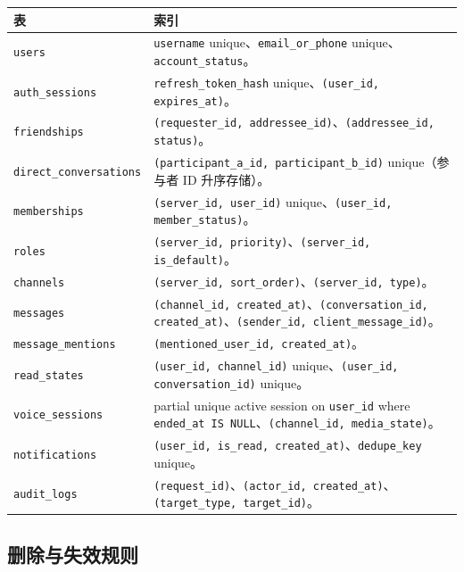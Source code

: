 \noindent\begin{tabularx}{\textwidth}{L{3.4cm}Y}
  \toprule
  表 & 索引 \\
  \midrule
  \texttt{users} & \texttt{username} unique、\texttt{email\_or\_phone} unique、\texttt{account\_status}。 \\
  \texttt{auth\_sessions} & \texttt{refresh\_token\_hash} unique、\texttt{(user\_id, expires\_at)}。 \\
  \texttt{friendships} & \texttt{(requester\_id, addressee\_id)}、\texttt{(addressee\_id, status)}。 \\
  \texttt{direct\_conversations} & \texttt{(participant\_a\_id, participant\_b\_id)} unique（参与者 ID 升序存储）。 \\
  \texttt{memberships} & \texttt{(server\_id, user\_id)} unique、\texttt{(user\_id, member\_status)}。 \\
  \texttt{roles} & \texttt{(server\_id, priority)}、\texttt{(server\_id, is\_default)}。 \\
  \texttt{channels} & \texttt{(server\_id, sort\_order)}、\texttt{(server\_id, type)}。 \\
  \texttt{messages} & \texttt{(channel\_id, created\_at)}、\texttt{(conversation\_id, created\_at)}、\texttt{(sender\_id, client\_message\_id)}。 \\
  \texttt{message\_mentions} & \texttt{(mentioned\_user\_id, created\_at)}。 \\
  \texttt{read\_states} & \texttt{(user\_id, channel\_id)} unique、\texttt{(user\_id, conversation\_id)} unique。 \\
  \texttt{voice\_sessions} & partial unique active session on \texttt{user\_id} where \texttt{ended\_at IS NULL}、\texttt{(channel\_id, media\_state)}。 \\
  \texttt{notifications} & \texttt{(user\_id, is\_read, created\_at)}、\texttt{dedupe\_key} unique。 \\
  \texttt{audit\_logs} & \texttt{(request\_id)}、\texttt{(actor\_id, created\_at)}、\texttt{(target\_type, target\_id)}。 \\
  \bottomrule
\end{tabularx}

\subsection{删除与失效规则}

